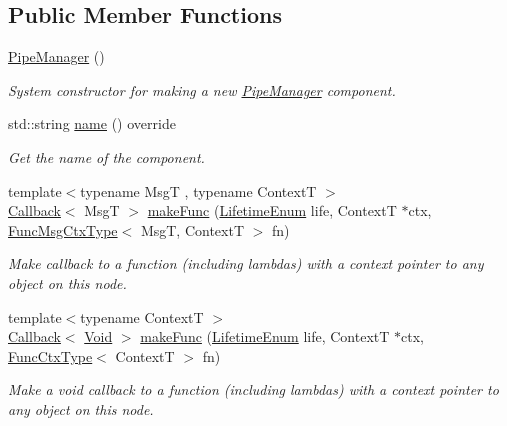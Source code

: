 \subsection*{Public Member Functions}
\begin{DoxyCompactItemize}
\item 
\hyperlink{structvt_1_1pipe_1_1_pipe_manager_aa2cf0e54dc146056c077aba1aa2ae42b}{Pipe\+Manager} ()
\begin{DoxyCompactList}\small\item\em System constructor for making a new \hyperlink{structvt_1_1pipe_1_1_pipe_manager}{Pipe\+Manager} component. \end{DoxyCompactList}\item 
std\+::string \hyperlink{structvt_1_1pipe_1_1_pipe_manager_aad60c922d604dd1b9ff47e428d265eed}{name} () override
\begin{DoxyCompactList}\small\item\em Get the name of the component. \end{DoxyCompactList}\item 
{\footnotesize template$<$typename MsgT , typename ContextT $>$ }\\\hyperlink{namespacevt_a36db99df4c973d48b1118a293fff533f}{Callback}$<$ MsgT $>$ \hyperlink{structvt_1_1pipe_1_1_pipe_manager_a9ceec59c887d0fa1498b931c788962f6}{make\+Func} (\hyperlink{namespacevt_1_1pipe_acb42b284378c0fdac1d7c6335dc26f58}{Lifetime\+Enum} life, ContextT $\ast$ctx, \hyperlink{structvt_1_1pipe_1_1_pipe_manager_base_a73fdf82ece0411b3dc644c99b763f7a9}{Func\+Msg\+Ctx\+Type}$<$ MsgT, ContextT $>$ fn)
\begin{DoxyCompactList}\small\item\em Make callback to a function (including lambdas) with a context pointer to any object on this node. \end{DoxyCompactList}\item 
{\footnotesize template$<$typename ContextT $>$ }\\\hyperlink{namespacevt_a36db99df4c973d48b1118a293fff533f}{Callback}$<$ \hyperlink{structvt_1_1pipe_1_1_pipe_manager_ab720c2580ecfd3ab36e49aeaaff64cc6}{Void} $>$ \hyperlink{structvt_1_1pipe_1_1_pipe_manager_a0143d5074ac61023fb97646f54bebd98}{make\+Func} (\hyperlink{namespacevt_1_1pipe_acb42b284378c0fdac1d7c6335dc26f58}{Lifetime\+Enum} life, ContextT $\ast$ctx, \hyperlink{structvt_1_1pipe_1_1_pipe_manager_base_ad8463823b6b4cfdb67c119d6d22e3bac}{Func\+Ctx\+Type}$<$ ContextT $>$ fn)
\begin{DoxyCompactList}\small\item\em Make a void callback to a function (including lambdas) with a context pointer to any object on this node. \end{DoxyCompactList}\item 

\end{DoxyCompactItemize}

